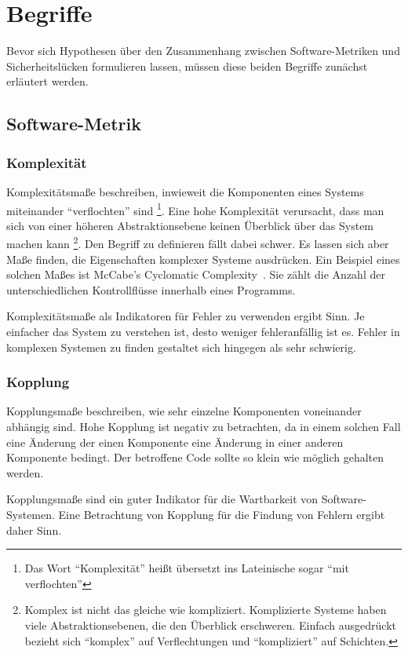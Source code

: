 \section{Begriffe}
\label{sec:begriffe}
Bevor sich Hypothesen über den Zusammenhang zwischen Software-Metriken und Sicherheitslücken formulieren lassen, müssen diese beiden Begriffe zunächst erläutert werden.
\subsection{Software-Metrik}

\subsubsection{Komplexität}
Komplexitätsmaße beschreiben, inwieweit die Komponenten eines Systems miteinander "`verflochten"' sind
\footnote{Das Wort "`Komplexität"' heißt übersetzt ins Lateinische sogar "`mit verflochten"'}.
Eine hohe Komplexität verursacht, dass man sich von einer höheren Abstraktionsebene keinen Überblick über das System machen kann
\footnote{Komplex ist nicht das gleiche wie kompliziert. Komplizierte Systeme haben viele Abstraktionsebenen, die den Überblick erschweren. Einfach ausgedrückt bezieht sich "`komplex"' auf Verflechtungen und "`kompliziert"' auf Schichten.}.
Den Begriff zu definieren fällt dabei schwer.
Es lassen sich aber Maße finden, die Eigenschaften komplexer Systeme ausdrücken.
Ein Beispiel eines solchen Maßes ist McCabe's Cyclomatic Complexity~\cite{mccabe1976}.
Sie zählt die Anzahl der unterschiedlichen Kontrollflüsse innerhalb eines Programms.

Komplexitätsmaße als Indikatoren für Fehler zu verwenden ergibt Sinn.
Je einfacher das System zu verstehen ist, desto weniger fehleranfällig ist es.
Fehler in komplexen Systemen zu finden gestaltet sich hingegen als sehr schwierig.

\subsubsection{Kopplung}
Kopplungsmaße beschreiben, wie sehr einzelne Komponenten voneinander abhängig sind.
Hohe Kopplung ist negativ zu betrachten, da in einem solchen Fall eine Änderung der einen Komponente eine Änderung in einer anderen Komponente bedingt.
Der betroffene Code sollte so klein wie möglich gehalten werden.

Kopplungsmaße sind ein guter Indikator für die Wartbarkeit von Software-Systemen.
Eine Betrachtung von Kopplung für die Findung von Fehlern ergibt daher Sinn.

